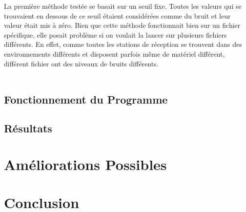 \documentclass[11pt]{article}
\begin{document}
La première méthode testée se basait sur un seuil fixe.
Toutes les valeurs qui se trouvaient en dessous de ce seuil étaient considérées comme du bruit et leur valeur était mis à zéro.
Bien que cette méthode fonctionnait bien sur un fichier spécifique, elle posait problème si on voulait la lancer sur plusieurs fichiers différents.
En effet, comme toutes les stations de réception se trouvent dans des environnements différents et disposent parfois même de matériel différent, différent fichier ont des niveaux de bruits différents.\\
\\


\subsection{Fonctionnement du Programme}

\subsection{Résultats}

\newpage

\section{Améliorations Possibles}

\newpage

\section{Conclusion}
\end{document}
